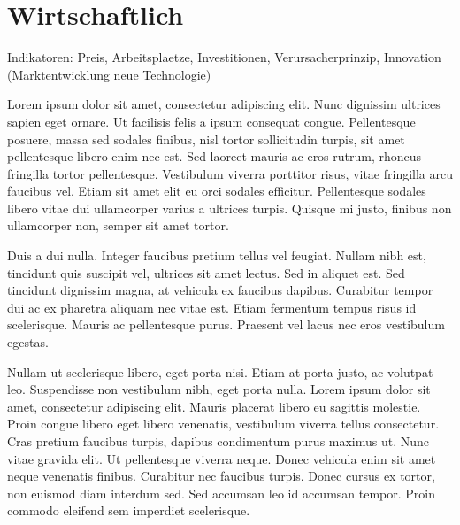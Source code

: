 \section{Wirtschaftlich}\label{sec:conflict}

Indikatoren: Preis, Arbeitsplaetze, Investitionen, Verursacherprinzip, Innovation (Marktentwicklung neue Technologie)

Lorem ipsum dolor sit amet, consectetur adipiscing elit. Nunc dignissim ultrices sapien eget ornare. Ut facilisis felis a ipsum consequat congue. Pellentesque posuere, massa sed sodales finibus, nisl tortor sollicitudin turpis, sit amet pellentesque libero enim nec est. Sed laoreet mauris ac eros rutrum, rhoncus fringilla tortor pellentesque. Vestibulum viverra porttitor risus, vitae fringilla arcu faucibus vel. Etiam sit amet elit eu orci sodales efficitur. Pellentesque sodales libero vitae dui ullamcorper varius a ultrices turpis. Quisque mi justo, finibus non ullamcorper non, semper sit amet tortor.

Duis a dui nulla. Integer faucibus pretium tellus vel feugiat. Nullam nibh est, tincidunt quis suscipit vel, ultrices sit amet lectus. Sed in aliquet est. Sed tincidunt dignissim magna, at vehicula ex faucibus dapibus. Curabitur tempor dui ac ex pharetra aliquam nec vitae est. Etiam fermentum tempus risus id scelerisque. Mauris ac pellentesque purus. Praesent vel lacus nec eros vestibulum egestas.

Nullam ut scelerisque libero, eget porta nisi. Etiam at porta justo, ac volutpat leo. Suspendisse non vestibulum nibh, eget porta nulla. Lorem ipsum dolor sit amet, consectetur adipiscing elit. Mauris placerat libero eu sagittis molestie. Proin congue libero eget libero venenatis, vestibulum viverra tellus consectetur. Cras pretium faucibus turpis, dapibus condimentum purus maximus ut. Nunc vitae gravida elit. Ut pellentesque viverra neque. Donec vehicula enim sit amet neque venenatis finibus. Curabitur nec faucibus turpis. Donec cursus ex tortor, non euismod diam interdum sed. Sed accumsan leo id accumsan tempor. Proin commodo eleifend sem imperdiet scelerisque.
